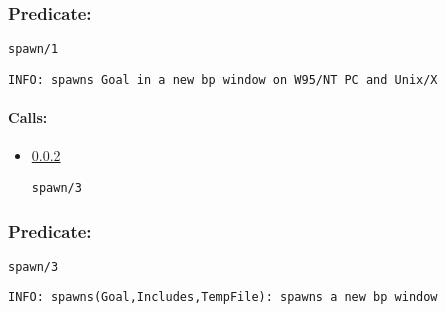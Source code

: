 \subsubsection{Predicate:} \label{spawnV95W1}

\begin{verbatim}
spawn/1
\end{verbatim}

{\small \begin{verbatim}
INFO: spawns Goal in a new bp window on W95/NT PC and Unix/X

\end{verbatim}}
\paragraph{Calls:} 
\begin{itemize}
\item \ref{spawnV95W3} 
\begin{verbatim}
spawn/3
\end{verbatim}

\end{itemize}

\subsubsection{Predicate:} \label{spawnV95W3}

\begin{verbatim}
spawn/3
\end{verbatim}

{\small \begin{verbatim}
INFO: spawns(Goal,Includes,TempFile): spawns a new bp window

\end{verbatim}}
